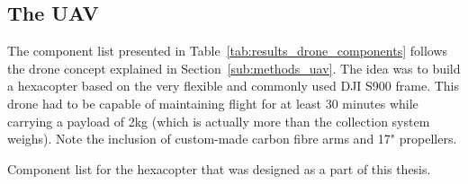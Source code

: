 \subsection{The \gls{UAV}}%
\label{sub:results_drone}

The component list presented in Table~\ref{tab:results_drone_components}
follows the drone concept explained in Section~\ref{sub:methods_uav}.
The idea was to build a hexacopter based on the very flexible and
commonly used DJI S900 frame. This drone had to be capable of
maintaining flight for at least 30 minutes while carrying a payload of
2kg (which is actually more than the collection system weighs). Note the
inclusion of custom-made carbon fibre arms and 17" propellers.


\begin{table}[htpb]
    \centering
    \caption{Component list for the hexacopter that was designed as a
    part of this thesis.}
\end{table}
